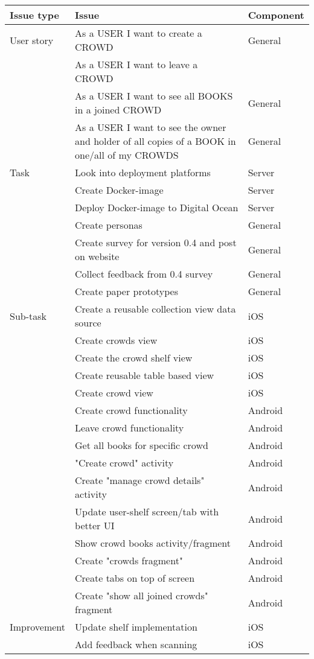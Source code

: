 \begin{longtable}{|L{2.5cm}|L{10cm}|L{2.5cm}|}
 \hline
\textbf{Issue type} & \textbf{Issue} & \textbf{Component} \\
 \hline
 
User story & As a USER I want to create a CROWD & General \\
 \hline
 & As a USER I want to leave a CROWD \\
  \hline
 & As a USER I want to see all BOOKS in a joined CROWD & General \\
  \hline
 & As a USER I want to see the owner and holder of all copies of a BOOK in one/all of my CROWDS & General \\
  \hline
  
Task & Look into deployment platforms & Server \\
 \hline
 & Create Docker-image & Server \\
   \hline
 & Deploy Docker-image to Digital Ocean & Server \\
  \hline
 & Create personas & General \\
  \hline
 & Create survey for version 0.4 and post on website & General \\
  \hline
 & Collect feedback from 0.4 survey & General \\
  \hline
 &  Create paper prototypes & General \\
  \hline
  
Sub-task & Create a reusable collection view data source & iOS \\
 \hline
 & Create crowds view & iOS \\
  \hline
 & Create the crowd shelf view & iOS \\
  \hline
 & Create reusable table based view & iOS \\
  \hline
 & Create crowd view & iOS \\
  \hline
 & Create crowd functionality & Android \\
  \hline
 & Leave crowd functionality & Android \\
  \hline
  & Get all books for specific crowd & Android \\
   \hline
 & "Create crowd" activity & Android \\
  \hline
 & Create "manage crowd details" activity & Android \\
  \hline
 & Update user-shelf screen/tab with better UI & Android \\
  \hline
 & Show crowd books activity/fragment & Android \\
  \hline
 & Create "crowds fragment" & Android \\
  \hline
 & Create tabs on top of screen & Android \\
  \hline
 & Create "show all joined crowds" fragment & Android \\
  \hline
 
Improvement & Update shelf implementation & iOS \\
 \hline
 & Add feedback when scanning & iOS \\
  \hline

\end{longtable}